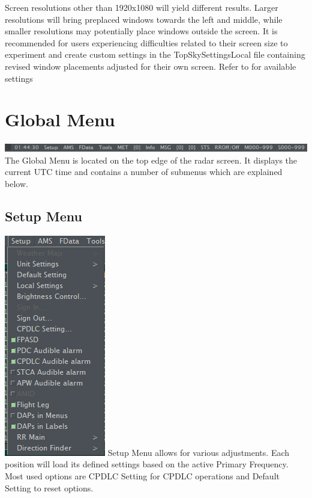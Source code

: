 \documentclass[11pt,a4paper,oldfontcommands]{memoir}
\begin{document}
Screen resolutions other than 1920x1080 will yield different results. Larger resolutions will bring preplaced windows towards the left and middle, while smaller resolutions may potentially place windows outside the screen. It is recommended for users experiencing difficulties related to their screen size to experiment and create custom settings in the TopSkySettingsLocal file containing revised window placements adjusted for their own screen. Refer to \texttt{} for available settings
\medskip

\section{Global Menu}
\label{menu:global}
\includegraphics{img/globalmenu.png}
\medskip
The Global Menu is located on the top edge of the radar screen. It displays the current UTC time and contains a number of submenus which are explained below.

\subsection{Setup Menu}
\label{menu:set}
\includegraphics{img/Setup.png}
\medskip
Setup Menu allows for various adjustments. Each position will load its defined settings based on the active Primary Frequency.
\medskip 
Most used options are CPDLC Setting for CPDLC operations and Default Setting to reset options.
\medskip
\end{document}
